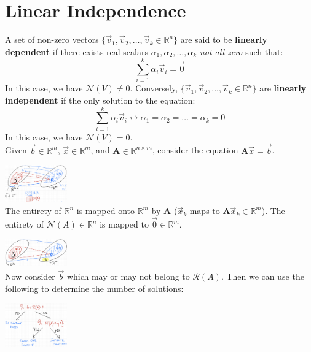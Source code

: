 \section{\small Linear Independence}

A set of non-zero vectors $\{\vec{v}_1, \vec{v}_2, \dots, \vec{v}_k \in
	\mathbb{R}^n\}$ are said to be \textbf{linearly dependent} if there exists real
scalars $\alpha_1, \alpha_2, \dots, \alpha_k$ \textit{not all zero} such that:
\[
	\sum_{i=1}^{k} \alpha_i \vec{v}_i = \vec{0}
\]
In this case, we have $\mathcal{N}(V) \neq 0$.
Conversely, $\{\vec{v}_1, \vec{v}_2, \dots, \vec{v}_k \in \mathbb{R}^n\}$ are
\textbf{linearly independent} if the only solution to the equation:
\[
	\sum_{i=1}^{k} \alpha_i \vec{v}_i \leftrightarrow \alpha_1 = \alpha_2 =
	\ldots = \alpha_k =
	0
\]
In this case, we have $\mathcal{N}(V) = 0$.\\

Given $\vec{b} \in \mathbb{R}^m$, $\vec{x} \in \mathbb{R}^m$, and $\mathbf{A}
	\in \mathbb{R}^{n \times m}$, consider the equation $\mathbf{A} \vec{x} = \vec{b}$.

\includegraphics[width=0.2\textwidth]{images/RnRm2.png} \\

The entirety of $\mathbb{R}^n$ is mapped onto $\mathbb{R}^m$ by $\mathbf{A}$
($\vec{x}_k$ maps to $\mathbf{A} \vec{x}_k \in \mathbb{R}^m$). The entirety of
$\mathcal{N}(A) \in \mathbb{R}^n$ is mapped to $\vec{0} \in \mathbb{R}^m$.

\includegraphics[width=0.2\textwidth]{images/RnRm.png} \\
Now consider $\vec{b}$ which may or may not belong to $\mathcal{R}(A)$. Then we
can use the following to determine the number of solutions:

\includegraphics[width=0.2\textwidth]{images/full_picture.png}
